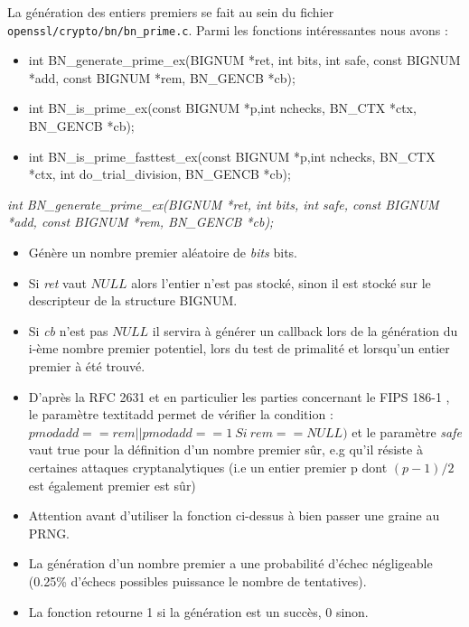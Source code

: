 			La génération des entiers premiers se fait au sein du fichier \texttt{openssl/crypto/bn/bn\_prime.c}. Parmi les fonctions intéressantes nous avons :
			\begin{itemize}
			\item int BN\_generate\_prime\_ex(BIGNUM *ret, int bits, int safe, const BIGNUM *add, const BIGNUM *rem, BN\_GENCB *cb);
			\item int BN\_is\_prime\_ex(const BIGNUM *p,int nchecks, BN\_CTX *ctx, BN\_GENCB *cb);
			\item int BN\_is\_prime\_fasttest\_ex(const BIGNUM *p,int nchecks, BN\_CTX *ctx, int do\_trial\_division, BN\_GENCB *cb);\\
			\end{itemize}

			\textit{int BN\_generate\_prime\_ex(BIGNUM *ret, int bits, int safe, const BIGNUM *add, const BIGNUM *rem, BN\_GENCB *cb);}  
			\begin{itemize}
			\item Génère un nombre premier aléatoire de \textit{bits} bits. 
			\item Si \textit{ret} vaut $NULL$ alors l'entier n'est pas stocké, sinon il est stocké sur le descripteur de la structure BIGNUM.
			\item Si \textit{cb} n'est pas $NULL$ il servira à générer un callback lors de la génération du i-ème nombre premier potentiel, lors du test de primalité et lorsqu'un entier premier à été trouvé.
			\item D'après la RFC 2631 \cite{rfc2631} et en particulier les parties concernant le FIPS 186-1 \cite{fips186-1}, le paramètre textit{add} permet de vérifier la condition : $p mod add == rem || p mod add == 1 \ Si\ rem == NULL)$ et le paramètre \textit{safe} vaut true pour la définition d'un nombre premier sûr, e.g qu'il résiste à certaines attaques cryptanalytiques (i.e un entier premier p dont $(p - 1)/2$ est également premier est sûr)
			\item Attention avant d'utiliser la fonction ci-dessus à bien passer une graine au PRNG.
			\item La génération d'un nombre premier a une probabilité d'échec négligeable (0.25\% d'échecs possibles puissance le nombre de tentatives).
			\item La fonction retourne 1 si la génération est un succès, 0 sinon.\\
			\end{itemize}

